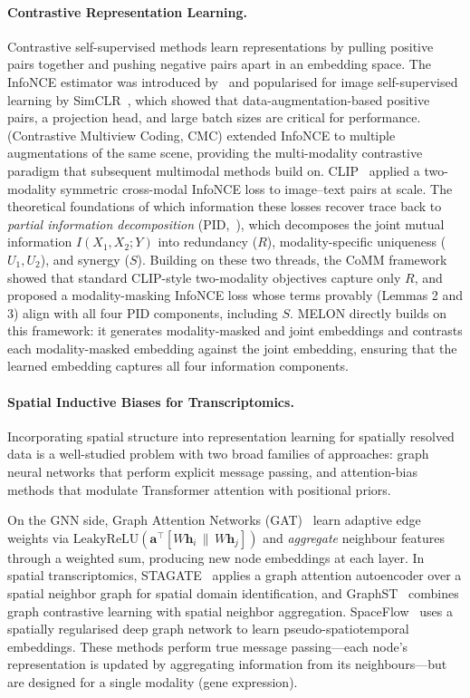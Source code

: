 \documentclass{article}
\theoremstyle{plain}
\theoremstyle{definition}
\begin{document}
\paragraph{Contrastive Representation Learning.}
Contrastive self-supervised methods learn representations by pulling positive pairs together and pushing negative pairs apart in an embedding space. The InfoNCE estimator was introduced by~\citet{oord2018representation} and popularised for image self-supervised learning by SimCLR~\cite{chen2020simple}, which showed that data-augmentation-based positive pairs, a projection head, and large batch sizes are critical for performance. \citet{tian2020contrastive} (Contrastive Multiview Coding, CMC) extended InfoNCE to multiple augmentations of the same scene, providing the multi-modality contrastive paradigm that subsequent multimodal methods build on. CLIP~\cite{radford2021learning} applied a two-modality symmetric cross-modal InfoNCE loss to image--text pairs at scale. The theoretical foundations of which information these losses recover trace back to \emph{partial information decomposition} (PID,~\citet{williams2010nonnegative,bertschinger2014quantifying}), which decomposes the joint mutual information $I(X_1, X_2; Y)$ into redundancy ($R$), modality-specific uniqueness ($U_1, U_2$), and synergy ($S$). Building on these two threads, the CoMM framework~\cite{dufumier2024align} showed that standard CLIP-style two-modality objectives capture only $R$, and proposed a modality-masking InfoNCE loss whose terms provably (Lemmas 2 and 3) align with all four PID components, including $S$. MELON directly builds on this framework: it generates modality-masked and joint embeddings and contrasts each modality-masked embedding against the joint embedding, ensuring that the learned embedding captures all four information components.

\paragraph{Spatial Inductive Biases for Transcriptomics.}
Incorporating spatial structure into representation learning for spatially resolved data is a well-studied problem with two broad families of approaches: graph neural networks that perform explicit message passing, and attention-bias methods that modulate Transformer attention with positional priors.

On the GNN side, Graph Attention Networks (GAT)~\cite{velivckovic2018gat} learn adaptive edge weights via $\mathrm{LeakyReLU}(\mathbf{a}^\top [W\mathbf{h}_i \,\|\, W\mathbf{h}_j])$ and \emph{aggregate} neighbour features through a weighted sum, producing new node embeddings at each layer. In spatial transcriptomics, STAGATE~\cite{dong2022deciphering} applies a graph attention autoencoder over a spatial neighbor graph for spatial domain identification, and GraphST~\cite{long2023spatially} combines graph contrastive learning with spatial neighbor aggregation. SpaceFlow~\cite{ren2022spaceflow} uses a spatially regularised deep graph network to learn pseudo-spatiotemporal embeddings. These methods perform true message passing---each node's representation is updated by aggregating information from its neighbours---but are designed for a single modality (gene expression).
\end{document}
